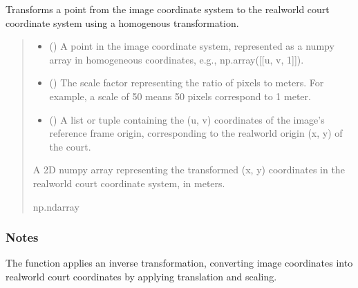 \documentclass[letterpaper,10pt,english]{sphinxmanual}
\begin{document}

\begin{fulllineitems}
\label{\detokenize{CameraUtils:CameraUtils.courtIMG2RW}}
\pysigstartsignatures
{}
\pysigstopsignatures
\sphinxAtStartPar
Transforms a point from the image coordinate system to the real\sphinxhyphen{}world court coordinate system
using a homogenous transformation.
\begin{quote}\begin{description}
\begin{itemize}
\item {} 
\sphinxAtStartPar
{} () \textendash{} A point in the image coordinate system, represented as a numpy array in homogeneous coordinates,
e.g., np.array({[}{[}u, v, 1{]}{]}).

\item {} 
\sphinxAtStartPar
{} () \textendash{} The scale factor representing the ratio of pixels to meters.
For example, a scale of 50 means 50 pixels correspond to 1 meter.

\item {} 
\sphinxAtStartPar
{} () \textendash{} A list or tuple containing the (u, v) coordinates of the image’s reference frame origin,
corresponding to the real\sphinxhyphen{}world origin (x, y) of the court.

\end{itemize}

\sphinxAtStartPar
A 2D numpy array representing the transformed (x, y) coordinates in the real\sphinxhyphen{}world
court coordinate system, in meters.

\sphinxAtStartPar
np.ndarray

\end{description}\end{quote}
\subsubsection*{Notes}

\sphinxAtStartPar
The function applies an inverse transformation, converting image coordinates into
real\sphinxhyphen{}world court coordinates by applying translation and scaling.

\end{fulllineitems}
\end{document}
